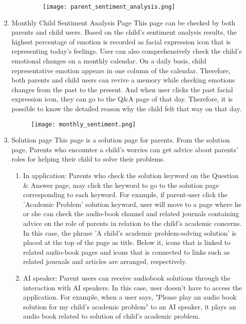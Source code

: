 \documentclass[conference]{IEEEtran}
\begin{document}
\begin{enumerate}
\begin{enumerate}
\begin{figure}[H]
                 \centering
                 \texttt{[image: parent\_sentiment\_analysis.png]}
                 \end{figure}
            \end{enumerate}
            \item Monthly Child Sentiment Analysis Page \hfill \break
            This page can be checked by both parents and child users. Based on the child's sentiment analysis results, the highest percentage of emotion is recorded as facial expression icon that is representing today's feelings. User can also comprehensively check the child's emotional changes on a monthly calendar. On a daily basis, child representative emotion appears in one column of the calendar. Therefore, both parents and child users can revive a memory while checking emotions changes from the past to the present. And when user clicks the past facial expression icon, they can go to the Q\&A page of that day. Therefore, it is possible to know the detailed reason why the child felt that way on that day.
            \begin{figure}[H]
                 \centering
                 \texttt{[image: monthly\_sentiment.png]}
                 \end{figure}
            \item Solution page \hfill \break
            This page is a solution page for parents. From the solution page, Parents who encounter a child's worries can get advice about parents' roles for helping their child to solve their problems.
            \begin{enumerate}
                \item In application:
                Parents who check the solution keyword on the Question \& Answer page, may click the keyword to go to the solution page corresponding to each keyword. For example, if parent-user click the 'Academic Problem' solution keyword, user will move to a page where he or she can check the audio-book channel and related journals containing advice on the role of parents in relation to the child's academic concerns. In this case, the phrase 'A child's academic problem-solving solution' is placed at the top of the page as title. Below it, icons that is linked to related audio-book pages and icons that is connected to links such as related journals and articles are arranged, respectively.
                \item AI speaker: Parent users can receive audiobook solutions through the interaction with AI speakers. In this case, user doesn't have to access the application. For example, when a user says, "Please play an audio book solution for my child's academic problem" to an AI speaker, it plays an audio book related to solution of child's academic problem.

\end{enumerate}
\end{enumerate}
\end{document}
